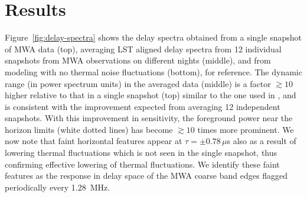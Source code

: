 \documentclass[preprint2,apjl,numberedappendix,twocolappendix,appendixfloats]{emulateapj}
\begin{document}
\section{Results}\label{sec:results}

Figure~\ref{fig:delay-spectra} shows the delay spectra obtained from a single snapshot of MWA data (top), averaging LST aligned delay spectra from 12 individual snapshots from MWA observations on different nights (middle), and from modeling \citep{thy15} with no thermal noise fluctuations (bottom), for reference. The dynamic range (in power spectrum units) in the averaged data (middle) is a factor $\gtrsim 10$ higher relative to that in a single snapshot (top) similar to the one used in \citet{thy15}, and is consistent with the improvement expected from averaging 12 independent snapshots. With this improvement in sensitivity, the foreground power near the horizon limits (white dotted lines) has become $\gtrsim 10$ times more prominent. We now note that faint horizontal features appear at $\tau = \pm 0.78\,\mu$s also as a result of lowering thermal fluctuations which is not seen in the single snapshot, thus confirming effective lowering of thermal fluctuations. We identify these faint features as the response in delay space of the MWA coarse band edges flagged periodically every 1.28~MHz. 
\end{document}
